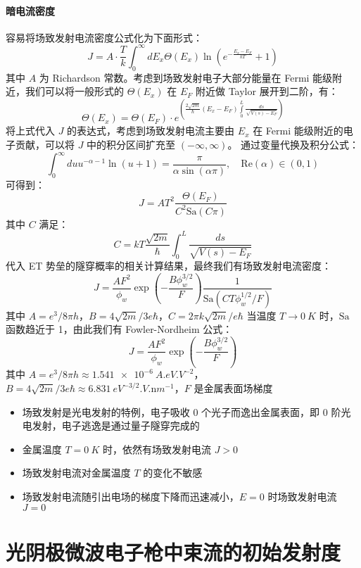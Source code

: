\paragraph{暗电流密度}
	容易将场致发射电流密度公式化为下面形式：
	\[J = A\cdot\frac{T}{k}\int_0^{\infty} dE_x\Theta(E_x)\ln\left(e^{-\frac{E_x-E_F}{kT}}+1\right)\]
	其中 $A$ 为 Richardson 常数。考虑到场致发射电子大部分能量在 Fermi 能级附近，我们可以将一般形式的 $\Theta(E_x)$ 在 $E_F$ 附近做 Taylor 展开到二阶，有：
	\[\Theta(E_x)=\Theta(E_F)\cdot e^{\left(\frac{2\sqrt{2m}}{\hbar}(E_x-E_F)\int\limits_0^L\frac{ds}{\sqrt{V(s)-E_F}}\right)}\]
	将上式代入 $J$ 的表达式，考虑到场致发射电流主要由 $E_x$ 在 Fermi 能级附近的电子贡献，可以将 $J$ 中的积分区间扩充至 $(-\infty, \infty)$。
	通过变量代换及积分公式：
	\[\int_0^{\infty}du u^{-\alpha-1}\ln(u+1)=\frac{\pi}{\alpha\sin(\alpha\pi)},\quad\mathrm{Re}(\alpha)\in(0, 1)\]
	可得到：
	\[J = AT^2\frac{\Theta(E_F)}{C^2\mathrm{Sa}(C\pi)}\]
	其中 $C$ 满足：
	\[C = kT\frac{\sqrt{2m}}{\hbar}\int_0^L\frac{ds}{\sqrt{V(s)-E_F}}\]
	代入 ET 势垒的隧穿概率的相关计算结果，最终我们有场致发射电流密度：
	\begin{equation}
	J=\frac{AF^2}{\phi_w}\exp\left(-\frac{B\phi_w^{3/2}}{F}\right)\frac{1}{\mathrm{Sa}(CT\phi_w^{1/2}/F)}
	\end{equation}
	其中 $A=e^3/8\pi h$，$B=4\sqrt{2m}/3e\hbar$，$C=2\pi k\sqrt{2m}/e\hbar$
	当温度 $T\rightarrow \SI{0}{K}$ 时，$\mathrm{Sa}$ 函数趋近于 1，由此我们有 Fowler-Nordheim 公式：
	\begin{equation}
	J=\frac{AF^2}{\phi_w}\exp\left(-\frac{B\phi_w^{3/2}}{F}\right)
	\end{equation}
	其中 $A=e^3/8\pi h\approx\SI{1.541e-6}{A.eV.V^{-2}}$，$B=4\sqrt{2m}/3e\hbar\approx\SI{6.831}{eV^{-3/2}.V.\nano m^{-1}}$，$F$ 是金属表面场梯度
\begin{itemize}
	\item 场致发射是光电发射的特例，电子吸收 0 个光子而逸出金属表面，即 0 阶光电发射，电子逃逸是通过量子隧穿完成的
	\item 金属温度 $T = \SI{0}{K}$ 时，依然有场致发射电流 $J > 0$
	\item 场致发射电流对金属温度 $T$ 的变化不敏感
	\item 场致发射电流随引出电场的梯度下降而迅速减小，$E = 0$ 时场致发射电流 $J = 0$
\end{itemize}

\section{光阴极微波电子枪中束流的初始发射度}

